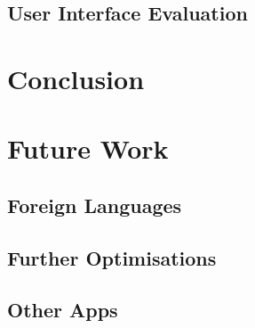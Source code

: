 \documentclass[12pt]{article}
\begin{document}
\subsection{User Interface Evaluation}


\newpage

\section{Conclusion}


\newpage

\section{Future Work}

\subsection{Foreign Languages}

\subsection{Further Optimisations}

\subsection{Other Apps}


\newpage

\printbibliography[heading=bibintoc]


\newpage
\end{document}
